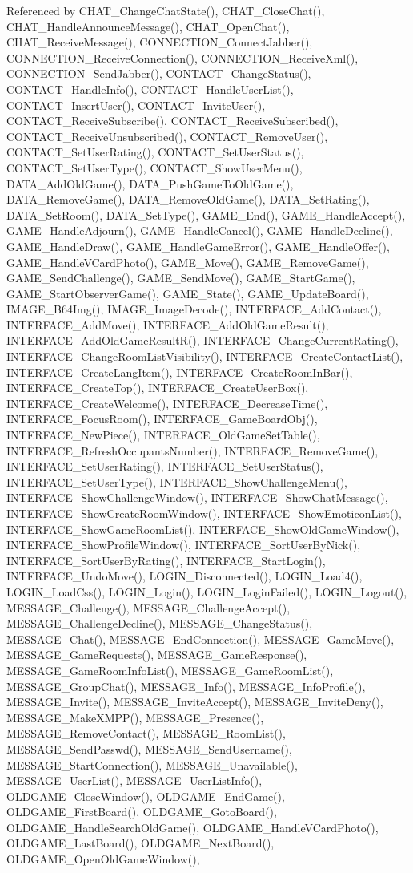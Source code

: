 Referenced by CHAT\_\-ChangeChatState(), CHAT\_\-CloseChat(), CHAT\_\-HandleAnnounceMessage(), CHAT\_\-OpenChat(), CHAT\_\-ReceiveMessage(), CONNECTION\_\-ConnectJabber(), CONNECTION\_\-ReceiveConnection(), CONNECTION\_\-ReceiveXml(), CONNECTION\_\-SendJabber(), CONTACT\_\-ChangeStatus(), CONTACT\_\-HandleInfo(), CONTACT\_\-HandleUserList(), CONTACT\_\-InsertUser(), CONTACT\_\-InviteUser(), CONTACT\_\-ReceiveSubscribe(), CONTACT\_\-ReceiveSubscribed(), CONTACT\_\-ReceiveUnsubscribed(), CONTACT\_\-RemoveUser(), CONTACT\_\-SetUserRating(), CONTACT\_\-SetUserStatus(), CONTACT\_\-SetUserType(), CONTACT\_\-ShowUserMenu(), DATA\_\-AddOldGame(), DATA\_\-PushGameToOldGame(), DATA\_\-RemoveGame(), DATA\_\-RemoveOldGame(), DATA\_\-SetRating(), DATA\_\-SetRoom(), DATA\_\-SetType(), GAME\_\-End(), GAME\_\-HandleAccept(), GAME\_\-HandleAdjourn(), GAME\_\-HandleCancel(), GAME\_\-HandleDecline(), GAME\_\-HandleDraw(), GAME\_\-HandleGameError(), GAME\_\-HandleOffer(), GAME\_\-HandleVCardPhoto(), GAME\_\-Move(), GAME\_\-RemoveGame(), GAME\_\-SendChallenge(), GAME\_\-SendMove(), GAME\_\-StartGame(), GAME\_\-StartObserverGame(), GAME\_\-State(), GAME\_\-UpdateBoard(), IMAGE\_\-B64Img(), IMAGE\_\-ImageDecode(), INTERFACE\_\-AddContact(), INTERFACE\_\-AddMove(), INTERFACE\_\-AddOldGameResult(), INTERFACE\_\-AddOldGameResultR(), INTERFACE\_\-ChangeCurrentRating(), INTERFACE\_\-ChangeRoomListVisibility(), INTERFACE\_\-CreateContactList(), INTERFACE\_\-CreateLangItem(), INTERFACE\_\-CreateRoomInBar(), INTERFACE\_\-CreateTop(), INTERFACE\_\-CreateUserBox(), INTERFACE\_\-CreateWelcome(), INTERFACE\_\-DecreaseTime(), INTERFACE\_\-FocusRoom(), INTERFACE\_\-GameBoardObj(), INTERFACE\_\-NewPiece(), INTERFACE\_\-OldGameSetTable(), INTERFACE\_\-RefreshOccupantsNumber(), INTERFACE\_\-RemoveGame(), INTERFACE\_\-SetUserRating(), INTERFACE\_\-SetUserStatus(), INTERFACE\_\-SetUserType(), INTERFACE\_\-ShowChallengeMenu(), INTERFACE\_\-ShowChallengeWindow(), INTERFACE\_\-ShowChatMessage(), INTERFACE\_\-ShowCreateRoomWindow(), INTERFACE\_\-ShowEmoticonList(), INTERFACE\_\-ShowGameRoomList(), INTERFACE\_\-ShowOldGameWindow(), INTERFACE\_\-ShowProfileWindow(), INTERFACE\_\-SortUserByNick(), INTERFACE\_\-SortUserByRating(), INTERFACE\_\-StartLogin(), INTERFACE\_\-UndoMove(), LOGIN\_\-Disconnected(), LOGIN\_\-Load4(), LOGIN\_\-LoadCss(), LOGIN\_\-Login(), LOGIN\_\-LoginFailed(), LOGIN\_\-Logout(), MESSAGE\_\-Challenge(), MESSAGE\_\-ChallengeAccept(), MESSAGE\_\-ChallengeDecline(), MESSAGE\_\-ChangeStatus(), MESSAGE\_\-Chat(), MESSAGE\_\-EndConnection(), MESSAGE\_\-GameMove(), MESSAGE\_\-GameRequests(), MESSAGE\_\-GameResponse(), MESSAGE\_\-GameRoomInfoList(), MESSAGE\_\-GameRoomList(), MESSAGE\_\-GroupChat(), MESSAGE\_\-Info(), MESSAGE\_\-InfoProfile(), MESSAGE\_\-Invite(), MESSAGE\_\-InviteAccept(), MESSAGE\_\-InviteDeny(), MESSAGE\_\-MakeXMPP(), MESSAGE\_\-Presence(), MESSAGE\_\-RemoveContact(), MESSAGE\_\-RoomList(), MESSAGE\_\-SendPasswd(), MESSAGE\_\-SendUsername(), MESSAGE\_\-StartConnection(), MESSAGE\_\-Unavailable(), MESSAGE\_\-UserList(), MESSAGE\_\-UserListInfo(), OLDGAME\_\-CloseWindow(), OLDGAME\_\-EndGame(), OLDGAME\_\-FirstBoard(), OLDGAME\_\-GotoBoard(), OLDGAME\_\-HandleSearchOldGame(), OLDGAME\_\-HandleVCardPhoto(), OLDGAME\_\-LastBoard(), OLDGAME\_\-NextBoard(), OLDGAME\_\-OpenOldGameWindow(), 